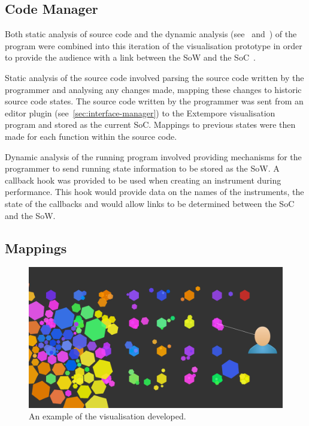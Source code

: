 \subsection{Code Manager}

Both static analysis of source code and the dynamic analysis (see~\cite{Eisenbarth2003} and~\cite{Jerding1997}) of the program were combined into this iteration of the visualisation prototype in order to provide the audience with a link between the \acf{SoW} and the \acf{SoC}~\cite{Swift2013}.

Static analysis of the source code involved parsing the source code written by the programmer and analysing any changes made, mapping these changes to historic source code states. The source code written by the programmer was sent from an editor plugin (see~\ref{sec:interface-manager}) to the Extempore visualisation program and stored as the current \ac{SoC}. Mappings to previous states were then made for each function within the source code.

Dynamic analysis of the running program involved providing mechanisms for the programmer to send running state information to be stored as the \ac{SoW}. A callback hook was provided to be used when creating an instrument during performance. This hook would provide data on the names of the instruments, the state of the callbacks and would allow links to be determined between the \ac{SoC} and the \ac{SoW}.

\subsection{Mappings}

\begin{figure}
\centering
\includegraphics[width=\textwidth]{../images/final-visualisations/final-code-visualisation.png}
\caption[Prototype (second iteration) example]{An example of the visualisation developed.}
\label{fig:final-visualisation}
\end{figure}

